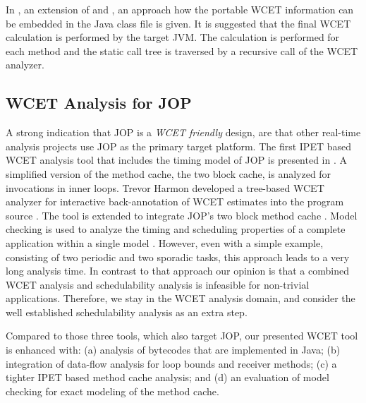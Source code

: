 In \cite{R:Bate:2002c}, an extension of \cite{R:Bernat:2000a} and
\cite{R:Bate:2000a}, an approach how the portable WCET information
can be embedded in the Java class file is given. It is suggested that
the final WCET calculation is performed by the target JVM. The
calculation is performed for each method and the static call tree is
traversed by a recursive call of the WCET analyzer.


\subsection{WCET Analysis for JOP}

A strong indication that JOP is a \emph{WCET friendly} design, are
that other real-time analysis projects use JOP as the primary target
platform. The first IPET based WCET analysis tool  that includes the
timing model of JOP is presented in \cite{jop:wcet:jtres06}. A
simplified version of the method cache, the two block cache, is
analyzed for invocations in inner loops. Trevor Harmon developed a
tree-based WCET analyzer for interactive back-annotation of WCET
estimates into the program source \cite{Trevor:Volta,phd:harmon}. The
tool is extended to integrate JOP's two block method cache
\cite{jop:volta:rtas2008}. Model checking is used to analyze the
timing and scheduling properties of a complete application within a
single model \cite{aau:jop:uppaal:2008}. However, even with a simple
example, consisting of two periodic and two sporadic tasks, this
approach leads to a very long analysis time. In contrast to that
approach our opinion is that a combined WCET analysis and
schedulability analysis is infeasible for non-trivial applications.
Therefore, we stay in the WCET analysis domain, and consider the well
established schedulability analysis as an extra step.

Compared to those three tools, which also target JOP, our presented
WCET tool is enhanced with: (a) analysis of bytecodes that are
implemented in Java; (b) integration of data-flow analysis for loop
bounds and receiver methods; (c) a tighter IPET based method cache
analysis; and (d) an evaluation of model checking for exact modeling
of the method cache.
